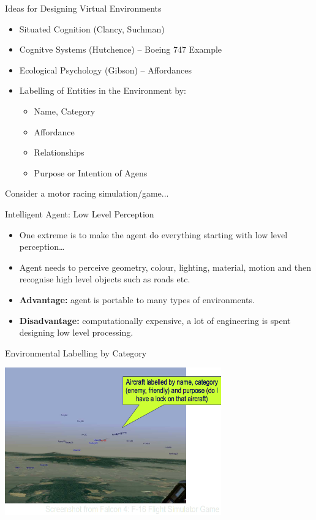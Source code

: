 \documentclass[aspectratio=1610,xcolor=dvipsnames,t]{beamer}
\begin{document}
\begin{frame}{Ideas for Designing Virtual Environments}
    \begin{itemize}
        \item Situated Cognition (Clancy, Suchman)
        \item Cognitve Systems (Hutchence) -- Boeing 747 Example
        \item Ecological Psychology (Gibson) -- Affordances
        \item Labelling of Entities in the Environment by:
            \begin{itemize}
                \item Name, Category
                \item Affordance
                \item Relationships
                \item Purpose or Intention of Agens
            \end{itemize}
    \end{itemize}
    
    Consider a motor racing simulation/game...
\end{frame}

\begin{frame}{Intelligent Agent: Low Level Perception}
    \begin{itemize}
        \item One extreme is to make the agent do everything starting 
              with low level perception…
        \item Agent needs to perceive geometry, colour, lighting, material, 
              motion and then recognise high level objects such as roads etc.
        \item \textbf{Advantage:} agent is portable to many types of environments.
        \item \textbf{Disadvantage:} computationally expensive, a lot of 
               engineering is spent designing low level processing.
    \end{itemize}
\end{frame} 

\begin{frame}{Environmental Labelling by Category} 
    \begin{center}
        \includegraphics[width=0.7\textwidth]{falcon} 
    \end{center}
\end{frame}
\end{document}
